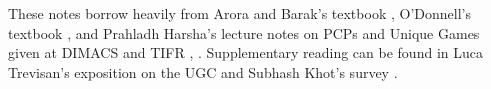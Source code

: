 \noindent These notes borrow heavily from Arora and Barak's textbook \cite{arora2009computational}, O'Donnell's textbook \cite{o2014analysis}, and Prahladh Harsha's lecture notes on PCPs and Unique Games given at DIMACS and TIFR
\cite{harsha2010limitsTIFR}, \cite{harsha2010limitsDIMACS}. Supplementary reading can be found in Luca Trevisan's exposition on the UGC \cite{trevisan2012khot} and Subhash Khot's survey \cite{khot2005unique}.
